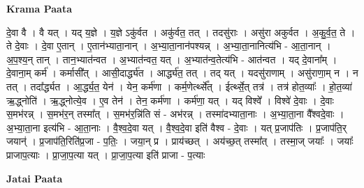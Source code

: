 \documentclass[17pt]{extarticle}
\begin{document}
\textbf{Krama Paata} \newline

दे॒वा वै । वै यत् । यद् य॒ज्ञे । य॒ज्ञे ऽकु॑र्वत । अकु॑र्वत॒ तत् । तदसु॑राः । असु॑रा अकुर्वत । अ॒कु॒र्व॒त॒ ते । ते दे॒वाः । दे॒वा ए॒तान् । ए॒तान॑भ्याता॒नान् । अ॒भ्या॒ता॒नान॑पश्यन्न् । अ॒भ्या॒ता॒नानित्य॑भि - आ॒ता॒नान् । अ॒प॒श्य॒न् तान् । तान॒भ्यात॑न्वत । अ॒भ्यात॑न्वत॒ यत् । अ॒भ्यात॑न्व॒तेत्य॑भि - आत॑न्वत । यद् दे॒वाना᳚म् । दे॒वाना॒म् कर्म॑ । कर्मासी᳚त् । आसी॒दार्द्ध्य॑त । आर्द्ध्य॑त॒ तत् । तद् यत् । यदसु॑राणाम् । असु॑राणा॒म् न । न तत् । तदा᳚र्द्ध्यत । आ॒र्द्ध्य॒त॒ येन॑ । येन॒ कर्म॑णा । कर्म॒णेर्त्थ्से᳚त् । ईर्त्थ्से॒त् तत्र॑ । तत्र॑ होत॒व्याः᳚ । हो॒त॒व्या॑ ऋ॒द्ध्नोति॑ । ऋ॒द्ध्नोत्ये॒व । ए॒व तेन॑ । तेन॒ कर्म॑णा । कर्म॑णा॒ यत् । यद् विश्वे᳚ । विश्वे॑ दे॒वाः । दे॒वाः स॒मभ॑रन्न् । स॒मभ॑र॒न् तस्मा᳚त् । स॒मभ॑र॒न्नि॑ति सं - अभ॑रन्न् । तस्मा॑दभ्याता॒नाः । अ॒भ्या॒ता॒ना वै᳚श्वदे॒वाः । अ॒भ्या॒ता॒ना इत्य॑भि - आ॒ता॒नाः । वै॒श्व॒दे॒वा यत् । वै॒श्व॒दे॒वा इति॑ वैश्व - दे॒वाः । यत् प्र॒जाप॑तिः । प्र॒जाप॑ति॒र् जयान्॑ । प्र॒जाप॑ति॒रिति॑प्र॒जा - प॒तिः॒ । जया॒न् प्र । प्राय॑च्छत् । अय॑च्छ॒त् तस्मा᳚त् । तस्मा॒ज् जयाः᳚ । 
जयाः᳚ प्राजाप॒त्याः । प्रा॒जा॒प॒त्या यत् । प्रा॒जा॒प॒त्या इति॑ प्राजा - प॒त्याः \newline

\textbf{Jatai Paata} \newline
\end{document}
